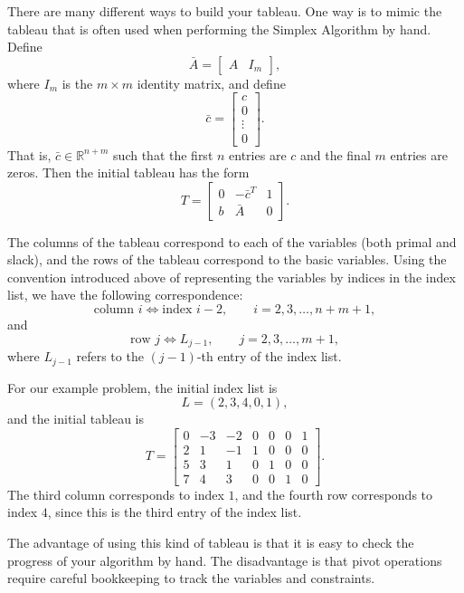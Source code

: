 There are many different ways to build your tableau.
One way is to mimic the tableau that is often used when performing the Simplex Algorithm by hand.
Define
\[
\bar{A} = \begin{bmatrix}
  A & I_m
\end{bmatrix},
\]
where $I_m$ is the $m \times m$ identity matrix,
and define
\[
\bar{c} = \begin{bmatrix}
  c\\
  0\\
  \vdots\\
  0
\end{bmatrix}.
\]
That is, $\bar{c} \in \mathbb{R}^{n+m}$ such that the first $n$ entries are $c$ and the final $m$ entries are zeros.
Then the initial tableau has the form
\begin{equation}
T = \begin{bmatrix}
    0 & -\bar{c}^T & 1  \\
    b & \bar{A} & 0
    \end{bmatrix}.
\label{eqn:hand_tab}
\end{equation}

The columns of the tableau correspond to each of the variables (both primal and slack), and the rows of the tableau 
correspond to the basic variables. Using the convention introduced above
of representing the variables by indices in the index list, we have the following correspondence:
\[
\text{column } i \Leftrightarrow \text{index } i-2, \qquad i = 2, 3, \ldots, n+m+1,
\]
and
\[
\text{row } j \Leftrightarrow L_{j-1}, \qquad j = 2, 3, \ldots, m+1,
\]
where $L_{j-1}$ refers to the $(j-1)$-th entry of the index list.

For our example problem, the initial index list is
\[
L = (2, 3, 4, 0, 1),
\]
and the initial tableau is
\begin{equation*}
T = \begin{bmatrix}
    0 & -3 & -2 & 0 & 0 & 0 & 1\\
    2 & 1 & -1 & 1 & 0 & 0 & 0\\
    5 & 3 & 1 & 0 & 1 & 0 & 0\\
    7 & 4 & 3 & 0 & 0 & 1 & 0
    \end{bmatrix}.
\end{equation*}
The third column corresponds to index $1$, and the fourth row corresponds to index $4$, since this is the
third entry of the index list.

The advantage of using this kind of tableau is that it is easy to check the progress of your algorithm by hand.
The disadvantage is that pivot operations require careful bookkeeping to track the variables and constraints.

